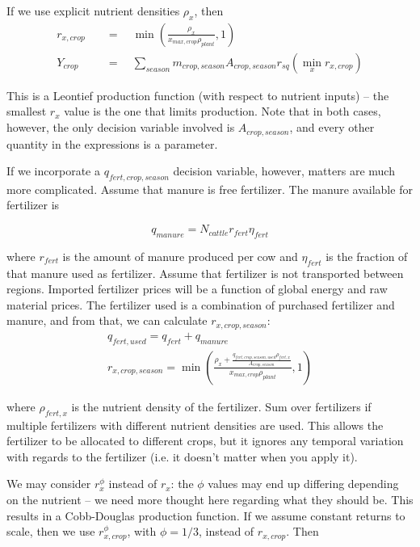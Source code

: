 \documentclass[letter,12pt]{article}
\begin{document}
If we use explicit nutrient densities $\rho_x$, then
\begin{align}
r_{x,crop} \quad &= \quad  \min \left(\frac{\rho_x}{x_{max,crop}\rho_{plant}},1 \right) \\
Y_{crop} \quad &= \quad  \sum_{season} m_{crop,season} A_{crop,season} r_{sq} \left(\min_x r_{x,crop} \right)
\end{align} 

This is a Leontief production function (with respect to nutrient inputs) -- the smallest $r_x$ value is the one that limits production.  Note that in both cases, however, the only decision variable involved is $A_{crop,season}$, and every other quantity in the expressions is a parameter.

If we incorporate a $q_{fert,crop,season}$ decision variable, however, matters are much more complicated.  Assume that manure is free fertilizer.  The manure available for fertilizer is

\begin{equation}
q_{manure} = N_{cattle} r_{fert} \eta_{fert}
\end{equation}

\noindent where $r_{fert}$ is the amount of manure produced per cow and $\eta_{fert}$ is the fraction of that manure used as fertilizer.  Assume that fertilizer is not transported between regions.  Imported fertilizer prices will be a function of global energy and raw material prices.  The fertilizer used is a combination of purchased fertilizer and manure, and from that, we can calculate $r_{x,crop,season}$:
\begin{align}
q_{fert,used} = q_{fert} + q_{manure} \\
r_{x,crop,season} = \min \left(\frac{\rho_x + \frac{q_{fert,crop,season,used} \rho_{fert,x}}{A_{crop,season}}}{x_{max,crop}\rho_{plant}},1 \right)
\end{align}

\noindent where $\rho_{fert,x}$ is the nutrient density of the fertilizer.  Sum over fertilizers if multiple fertilizers with different nutrient densities are used.  This allows the fertilizer to be allocated to different crops, but it ignores any temporal variation with regards to the fertilizer (i.e. it doesn't matter when you apply it). 

We may consider $r_x^{\phi}$ instead of $r_x$: the $\phi$ values may end up differing depending on the nutrient -- we need more thought here regarding what they should be.  This results in a Cobb-Douglas production function.  If we assume constant returns to scale, then we use $r_{x,crop}^{\phi}$, with $\phi = 1/3$, instead of $r_{x,crop}$.  Then
\end{document}
